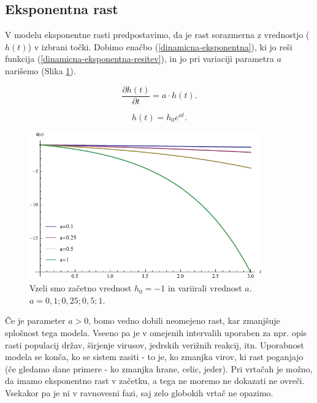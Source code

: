 \documentclass[a4paper, twoside, 12pt]{book}
\begin{document}
    \subsection{Eksponentna rast}

    V modelu eksponentne rasti predpostavimo, da je rast sorazmerna z vrednostjo ($h(t)$) v izbrani točki. Dobimo enačbo (\ref{dinamicna-eksponentna}), ki jo reši funkcija (\ref{dinamicna-eksponentna-resitev}), in jo pri variaciji parametra $a$ narišemo (Slika \ref{fig:eksponentna-rast}).

    \begin{equation}
      \frac{\partial h(t)}{\partial t} = a \cdot h(t).
      \label{dinamicna-eksponentna}
    \end{equation}

    \begin{equation}
      h(t) = h_0 e^{a t}.
      \label{dinamicna-eksponentna-resitev}
    \end{equation}

    \begin{figure}[h]
      \begin{center}
        \includegraphics[width=10cm]{slike/eksponentna-rast}
      \end{center}
      \caption{Vzeli smo začetno vrednost $h_0 = -1$ in variirali vrednost $a$. \newline $a=0,1;0,25;0,5;1$.}
      \label{fig:eksponentna-rast}
    \end{figure}

    Če je parameter $a > 0$, bomo vedno dobili neomejeno rast, kar zmanjšuje splošnost tega modela. Vseeno pa je v omejenih intervalih uporaben za npr. opis rasti populacij držav, širjenje virusov, jedrskih verižnih reakcij, itn. Uporabnost modela se konča, ko se sistem zasiti - to je, ko zmanjka virov, ki rast poganjajo (če gledamo dane primere - ko zmanjka hrane, celic, jeder).
    Pri vrtačah je možno, da imamo eksponentno rast v začetku, a tega ne moremo ne dokazati ne ovreči. Vsekakor pa je ni v ravnovesni fazi, saj zelo globokih vrtač ne opazimo.
\end{document}
